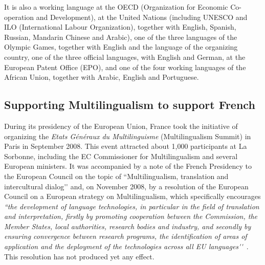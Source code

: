 \documentclass[]{../metanetpaper}
\begin{document}
\begin{multicols}{2}
It is also a working language at the OECD (Organization for Economic
Co-operation and Development), at the United Nations (including UNESCO
and ILO (International Labour Organization), together with English,
Spanish, Russian, Mandarin Chinese and Arabic), one of the three
languages of the Olympic Games, together with English and the language
of the organizing country, one of the three official languages, with
English and German, at the European Patent Office (EPO), and one of
the four working languages of the African Union, together with Arabic,
English and Portuguese.

\subsection{Supporting Multilingualism to support French}

During its presidency of the European Union, France took the
initiative of organizing the {\em Etats Généraux du Multilinguisme}
(Multilingualism Summit) in Paris in September 2008. This event
attracted about 1,000 participants at La Sorbonne, including the EC
Commissioner for Multilingualism and several European ministers. It
was accompanied by a note of the French Presidency to the European
Council on the topic of ``Multilingualism, translation and
intercultural dialog{\mbox '}{\mbox '} and, on November 2008, by a
resolution of the European Council on a European strategy on
Multilingualism, which specifically encourages {\em ``the development
  of language technologies, in particular in the field of translation
  and interpretation, firstly by promoting cooperation between the
  Commission, the Member States, local authorities, research bodies
  and industry, and secondly by ensuring convergence between research
  programs, the identification of areas of application and the
  deployment of the technologies across all EU languages{\mbox
    '}{\mbox '}}~\cite{eurlex}. This resolution has not produced yet
any effect.


\end{multicols}
\end{document}
